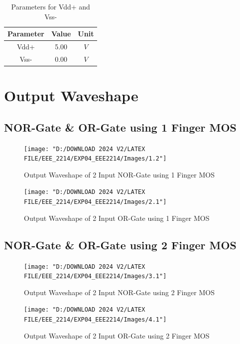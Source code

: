 \documentclass[a4paper,12pt]{article}
\begin{document}
	\begin{table}[H]
		\centering
		\caption{Parameters for Vdd+ and Vss- }
		\begin{tabular}{|c|c|c|}
			\hline
			\textbf{Parameter} & \textbf{Value} & \textbf{Unit} \\ \hline
			Vdd+               & 5.00           & $V $            \\ \hline
			Vss-               & 0.00           & $V$             \\ \hline
		\end{tabular}
		
	\end{table}
	
	\newpage
	\section{Output Waveshape }
	\subsection{NOR-Gate \& OR-Gate using 1 Finger MOS}
	\begin{figure}[H]
		\centering
		\texttt{[image: "D:/DOWNLOAD 2024 V2/LATEX FILE/EEE\_2214/EXP04\_EEE2214/Images/1.2"]}
		\caption{Output Waveshape of 2 Input NOR-Gate using 1 Finger MOS}
		\label{fig:1nand}
	\end{figure}

	\begin{figure}[H]
		\centering
	\texttt{[image: "D:/DOWNLOAD 2024 V2/LATEX FILE/EEE\_2214/EXP04\_EEE2214/Images/2.1"]}
		\caption{Output Waveshape of 2 Input OR-Gate using 1 Finger MOS }
		\label{fig:1and}
	\end{figure}
	
	\newpage
	\subsection{NOR-Gate \& OR-Gate using 2 Finger MOS}
	
	\begin{figure}[H]
		\centering
		\texttt{[image: "D:/DOWNLOAD 2024 V2/LATEX FILE/EEE\_2214/EXP04\_EEE2214/Images/3.1"]}
		\caption{Output Waveshape of 2 Input NOR-Gate using 2 Finger MOS}
		\label{fig:2nand}
	\end{figure}
	
	\begin{figure}[H]
		\centering
			\texttt{[image: "D:/DOWNLOAD 2024 V2/LATEX FILE/EEE\_2214/EXP04\_EEE2214/Images/4.1"]}
		\caption{Output Waveshape of 2 Input OR-Gate using 2 Finger MOS }
		\label{fig:2and}
	\end{figure}
	\newpage
\end{document}
